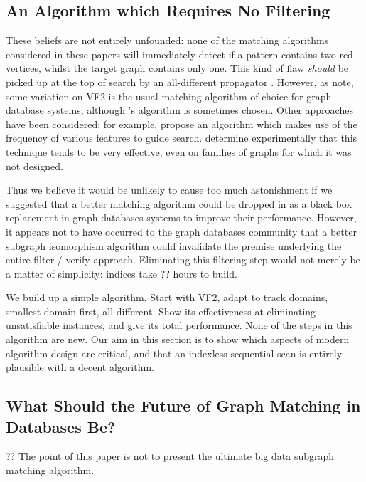 \documentclass[twoside,11pt]{article}
\newcommand{\citet}[1]{\citeA{#1}}
\newcommand{\citep}[1]{\cite{#1}}
\begin{document}
\subsection{An Algorithm which Requires No Filtering}

These beliefs are not entirely unfounded: none of the matching algorithms considered in these papers
will immediately detect if a pattern contains two red vertices, whilst the target graph contains
only one. This kind of flaw \emph{should} be picked up at the top of search by an all-different
propagator \citep{DBLP:conf/aaai/Regin94}.  However, as \citet{DBLP:journals/pvldb/KatsarouNT15}
note, some variation on VF2 \citep{Cordella:2004} is the usual matching algorithm of choice for
graph database systems, although 's algorithm is sometimes
chosen. Other approaches have been considered: for example, \citet{DBLP:journals/pvldb/ShangZLY08}
propose an algorithm which makes use of the frequency of various features to guide search.
\citet{DBLP:journals/pvldb/LeeHKL12} determine experimentally that this technique tends to be very
effective, even on families of graphs for which it was not designed.

Thus we believe it would be unlikely to cause too much astonishment if we suggested that a better
matching algorithm could be dropped in as a black box replacement in graph databases systems to
improve their performance. However, it appears not to have occurred to the graph databases community
that a better subgraph isomorphism algorithm could invalidate the premise underlying the entire
filter / verify approach. Eliminating this filtering step would not merely be a matter of
simplicity: indices take ??  hours to build.

We build up a simple algorithm. Start with VF2, adapt to track domains, smallest domain first, all
different. Show its effectiveness at eliminating unsatisfiable instances, and give its total
performance.  None of the steps in this algorithm are new. Our aim in this section is to show which
aspects of modern algorithm design are critical, and that an indexless sequential scan is entirely
plausible with a decent algorithm.

\subsection{What Should the Future of Graph Matching in Databases Be?}

?? The point of this paper is not to present the ultimate big data subgraph matching algorithm.
\end{document}
